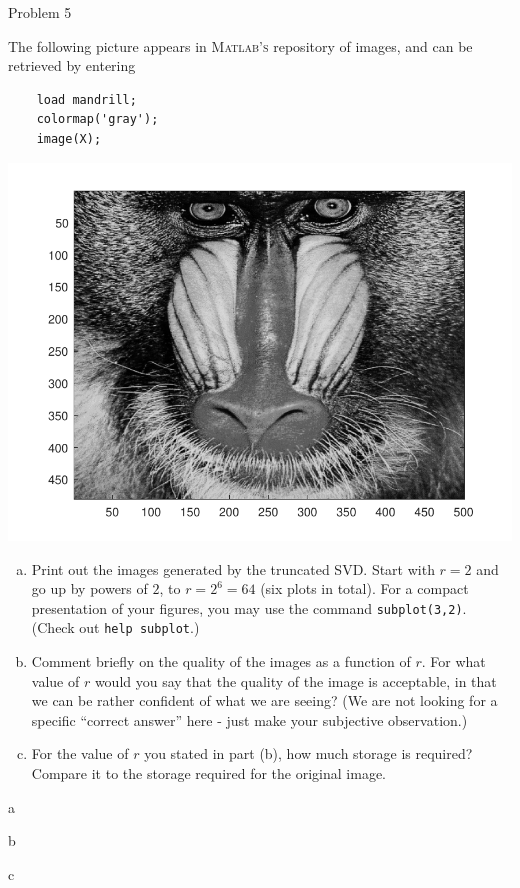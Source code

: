 \begin{section}{Problem 5}
    \begin{problem}{5}
        The following picture appears in \textsc{Matlab's} repository of images, and can be retrieved by entering 
        \begin{verbatim}
    load mandrill; 
    colormap('gray'); 
    image(X);
        \end{verbatim}
        \begin{center}
            \includegraphics[scale=0.7]{mandrill2.pdf}
        \end{center}
        
        \begin{enumerate}[(a)]
            \item Print out the images generated by the truncated SVD. Start with $r=2$ and go up by powers of $2$, to $r=2^6=64$ (six plots in total). For a compact presentation of your figures, you may use the command {\tt subplot(3,2)}. (Check out {\tt help subplot}.)        
            \item Comment briefly on the quality of the images as a function of $r$. For what value of $r$ would you say that the quality of the image is acceptable, in that we can be rather confident of what we are seeing? (We are not looking for a specific ``correct answer'' here - just make your subjective observation.)
            \item For the value of $r$ you stated in part (b), how much storage is required? Compare it to the storage required for the original image.
        \end{enumerate}
    \end{problem}

    \begin{solution}{a}
    \end{solution}

    \newpage
    
    \begin{solution}{b}
    \end{solution}

    \begin{solution}{c}
    \end{solution}
\end{section}